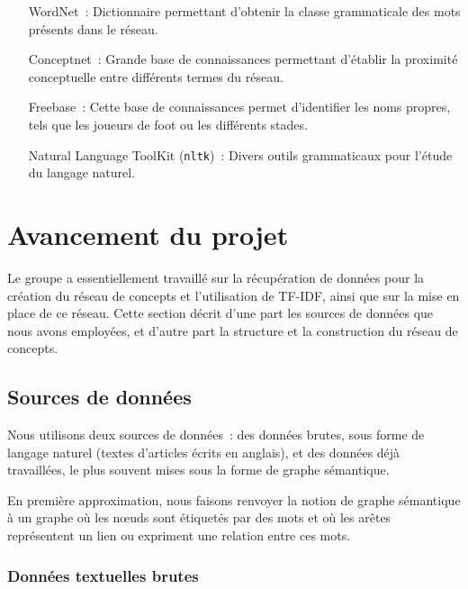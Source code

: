 \documentclass[a4paper, 12pt]{article}
\newcommand{\pyt}[1]{\texttt{#1}}%
\begin{document}
\begin{itemize}
	\item[WordNet~: ]Dictionnaire permettant d'obtenir la classe grammaticale des mots présents dans le réseau.
	\item[Conceptnet~: ]Grande base de connaissances permettant d'établir la proximité conceptuelle entre différents termes du réseau.
	\item[Freebase~: ]Cette base de connaissances permet d'identifier les noms propres, tels que les joueurs de foot ou les différents stades.
	\item[Natural Language ToolKit (\pyt{nltk})~: ]Divers outils grammaticaux pour l'étude du langage naturel.
\end{itemize}



\section{Avancement du projet}

Le groupe a essentiellement travaillé sur la récupération de données pour la création du réseau de concepts et l'utilisation de TF-IDF, ainsi que sur la mise en place de ce réseau. Cette section décrit d'une part les sources de données que nous avons employées, et d'autre part la structure et la construction du réseau de concepts.

\subsection{Sources de données}

Nous utilisons deux sources de données~: des données brutes, sous forme de langage naturel (textes d'articles écrits en anglais), et des données déjà travaillées, le plus souvent mises sous la forme de graphe sémantique.

\begin{definition}
En première approximation, nous faisons renvoyer la notion de graphe sémantique à un graphe où les nœuds sont étiquetés par des mots et où les arêtes représentent un lien ou expriment une relation entre ces mots.
\end{definition}


\subsubsection{Données textuelles brutes}
\end{document}
